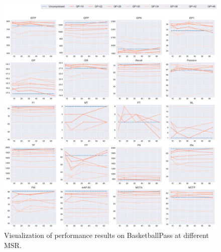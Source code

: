 \begin{figure}[!htbp]
\centering
\includegraphics[width=1.0\linewidth]{img/appendix/BasketballPass_all_multiplots_msr.pdf}
\caption[Visualization of performance results on BasketballPass at different MSR]
{Visualization of performance results on BasketballPass at different MSR.}
\label{fig:BasketballPass_all_msr}
\end{figure}



